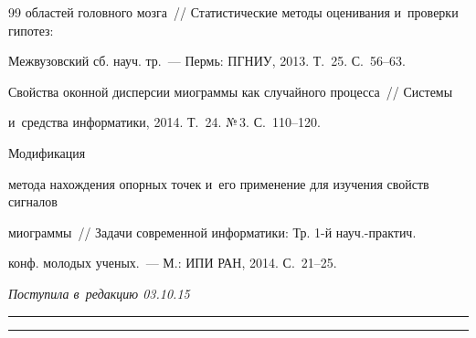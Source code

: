 {{\begin{thebibliography}{99}
областей головного мозга~/\!\!/ Статистические методы оценивания и~проверки гипотез: 

Межвузовский сб. науч. тр.~--- Пермь: ПГНИУ, 2013.  Т.~25. С.~56--63.





Свойства оконной дисперсии миограммы как случайного процесса~/\!\!/ Системы 

и~средства информатики, 2014. Т.~24. №\,3. С.~110--120.




 Модификация 

метода нахождения опорных точек и~его применение для изучения свойств сигналов 

миограммы~/\!\!/ Задачи современной информатики: Тр. 1-й науч.-практич. 

конф. молодых ученых.~--- М.: ИПИ РАН, 2014. С.~21--25.

   \end{thebibliography}

} }





\vspace*{-9pt}



\hfill{\small\textit{Поступила в~редакцию 03.10.15}}









\vspace*{9pt}



\hrule



\vspace*{2pt}



\hrule










\def\tit{METHOD OF SYNCHRONIZATION OF~MAGNETOENCEPHALOGRAMS AND~MYOGRAMS SIGNALS}



